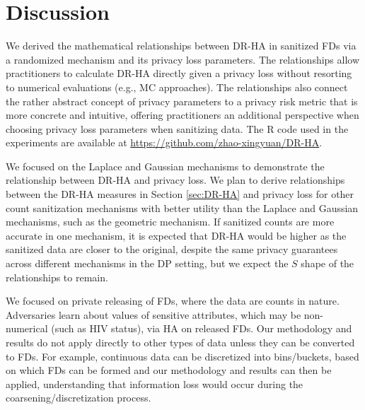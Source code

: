 \documentclass[10pt,journal,compsoc]{IEEEtran}
\begin{document}
\vspace{-9pt} \section{Discussion}\label{sec:discussion}\vspace{-4pt} 
We derived the mathematical relationships between DR-HA in sanitized FDs via a randomized mechanism and  its privacy loss parameters. The relationships allow  practitioners to calculate DR-HA directly given a privacy loss without resorting to numerical evaluations (e.g., MC approaches). The  relationships also connect the rather abstract concept of privacy parameters to a privacy risk metric that is more concrete and intuitive, offering practitioners an additional perspective when choosing privacy loss parameters when sanitizing data. The R code used in the experiments are available at \url{https://github.com/zhao-xingyuan/DR-HA}. 

We focused on the Laplace and Gaussian mechanisms to demonstrate  the relationship between  DR-HA and  privacy loss. We plan to derive relationships between the DR-HA measures in Section \ref{sec:DR-HA} and privacy loss for other count sanitization mechanisms  with better utility than the Laplace and Gaussian mechanisms, such as the geometric mechanism. If sanitized counts are more accurate in one mechanism, it is expected that DR-HA would be higher as the sanitized data are closer to the original, despite the same privacy guarantees  across different mechanisms in the DP setting, but we expect the $S$ shape of the relationships to remain. 

We focused on private releasing of FDs, where the data are counts in nature. Adversaries learn about values of sensitive attributes, which may be non-numerical (such as HIV status), via HA on released FDs. Our methodology and results do not apply directly  to other types of data unless they can be converted to FDs. For example, continuous data can be discretized into bins/buckets, based on which FDs can be formed  and our methodology and results can then be applied, understanding that information loss would occur during the coarsening/discretization process.
\end{document}
